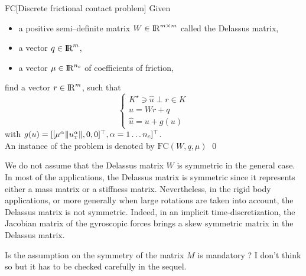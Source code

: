 {\begin{problemenv}{FC}[Discrete frictional contact problem]\label{prob:II}
  Given
  \begin{itemize}
    \item a positive semi--definite  matrix ${W} \in \mathrm{I\!R}^{m \times m}$ called the Delassus matrix,
    \item a vector $ {q} \in \mathrm{I\!R}^m$,
    \item a vector $\mu \in \mathrm{I\!R}^{n_c}$ of coefficients of friction, 
  \end{itemize}
find  a vector $r\in \mathrm{I\!R}^m$, such that
\begin{equation}\label{eq:soccp2}
  \begin{cases}
   K^\star \ni {\hat u} \perp r \in K \\[2mm]
    u =Wr +q \\[2mm]
    \hat u =u + g(u)
  \end{cases}
\end{equation}
with $g(u) = [[\mu^\alpha  \|u^\alpha_{\hbox{\tiny{T}}}\|, 0, 0 ]^\top, \alpha = 1\ldots n_c]^\top$. \\
An instance of the problem is denoted by $\mathrm{FC}(W,q,\mu)$
\qed
\end{problemenv}
%

\begin{remark}
  \label{Re:symmetry}
  We do not assume that the Delassus matrix $W$ is symmetric in the general case. In most of the applications, the Delassus matrix is symmetric since it represents either a mass matrix or a stiffness matrix. Nevertheless, in the rigid body applications, or more generally when large rotations are taken into account, the Delassus matrix is not symmetric. Indeed, in an implicit time-discretization, the Jacobian matrix of the gyroscopic forces brings a skew symmetric matrix in the Delassus matrix. 
\end{remark}

\begin{ndrva}
  Is the assumption on the symmetry of the matrix $M$ is mandatory ? I don't think so but it has to be checked carefully in the sequel.
\end{ndrva}
%




}
